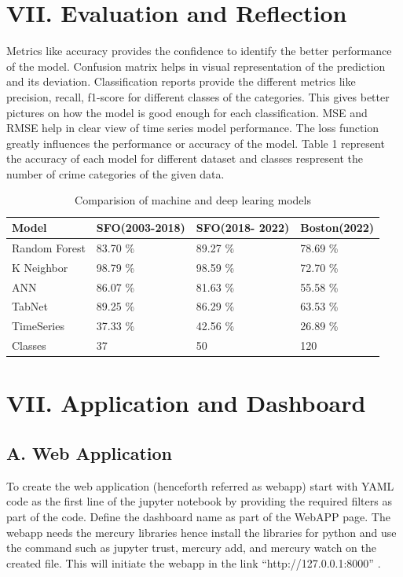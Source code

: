 \documentclass[conference,final,]{IEEEtran}
\begin{document}
\section{VII. Evaluation and
Reflection}\label{vii.-evaluation-and-reflection}

Metrics like accuracy provides the confidence to identify the better
performance of the model. Confusion matrix helps in visual
representation of the prediction and its deviation. Classification
reports provide the different metrics like precision, recall, f1-score
for different classes of the categories. This gives better pictures on
how the model is good enough for each classification. MSE and RMSE help
in clear view of time series model performance. The loss function
greatly influences the performance or accuracy of the model. Table 1
represent the accuracy of each model for different dataset and classes
respresent the number of crime categories of the given data.

\begin{table}
\centering
\caption{\label{tab:unnamed-chunk-16}Comparision of machine and deep learing models}
\centering
\begin{tabular}[t]{l|l|l|l}
\hline
Model & SFO(2003-2018) & SFO(2018- 2022) & Boston(2022)\\
\hline
Random Forest & 83.70 \% & 89.27 \% & 78.69 \%\\
\hline
K Neighbor & 98.79 \% & 98.59 \% & 72.70 \%\\
\hline
ANN & 86.07 \% & 81.63 \% & 55.58 \%\\
\hline
TabNet & 89.25 \% & 86.29 \% & 63.53 \%\\
\hline
TimeSeries & 37.33 \% & 42.56 \% & 26.89 \%\\
\hline
Classes & 37 & 50 & 120\\
\hline
\end{tabular}
\end{table}

\section{VII. Application and
Dashboard}\label{vii.-application-and-dashboard}

\subsection{A. Web Application}\label{a.-web-application}

To create the web application (henceforth referred as webapp) start with
YAML code as the first line of the jupyter notebook by providing the
required filters as part of the code. Define the dashboard name as part
of the WebAPP page. The webapp needs the mercury libraries hence install
the libraries for python and use the command such as jupyter trust,
mercury add, and mercury watch on the created file. This will initiate
the webapp in the link ``http://127.0.0.1:8000'' .
\end{document}
